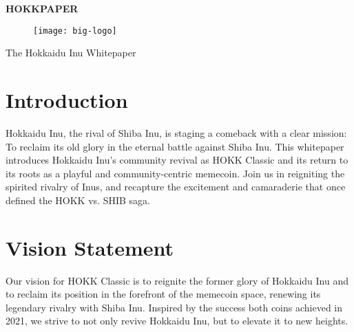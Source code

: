 \documentclass{article}
\begin{document}
\pagestyle{fancy}
\thispagestyle{empty}
\fancyhead{} %
\fancyfoot{} %

\begin{center}
  \huge
  \colorbox{pink1}{\textbf{HOKKPAPER}}
\end{center}

\vspace{30mm}

\begin{figure}[h]
  \centering
  \texttt{[image: big-logo]}
\end{figure}

\vspace{30mm}
\begin{center}
  \large
  The Hokkaidu Inu Whitepaper
\end{center}

\clearpage

\xpretocmd\headrule{\color{pink1}}{}{\PatchFailed}
\renewcommand{\headrulewidth}{1pt}
\fancyfoot[R]{\thepage}

\setcounter{page}{1}

\section{Introduction}
Hokkaidu Inu, the rival of Shiba Inu, is staging a comeback with a clear mission: To reclaim its old glory in the eternal battle against Shiba Inu. This whitepaper introduces Hokkaidu Inu's community revival as HOKK Classic and its return to its roots as a playful and community-centric memecoin. Join us in reigniting the spirited rivalry of Inus, and recapture the excitement and camaraderie that once defined the HOKK vs. SHIB saga.

\section{Vision Statement}
Our vision for HOKK Classic is to reignite the former glory of Hokkaidu Inu and to reclaim its position in the forefront of the memecoin space, renewing its legendary rivalry with Shiba Inu. Inspired by the success both coins achieved in 2021, we strive to not only revive Hokkaidu Inu, but to elevate it to new heights.
\end{document}
